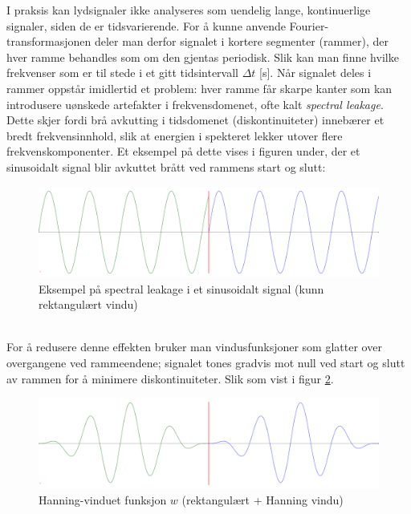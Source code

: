 \noindent
I praksis kan lydsignaler ikke analyseres som uendelig lange, kontinuerlige signaler, siden de er tidsvarierende. For å kunne anvende Fourier-transformasjonen deler man derfor signalet i kortere segmenter (rammer), der hver ramme behandles som om den gjentas periodisk. Slik kan man finne hvilke frekvenser som er til stede i et gitt tidsintervall $\Delta t$ [s].
Når signalet deles i rammer oppstår imidlertid et problem: hver ramme får skarpe kanter som kan introdusere uønskede artefakter i frekvensdomenet, ofte kalt \textit{spectral leakage}. Dette skjer fordi brå avkutting i tidsdomenet (diskontinuiteter) innebærer et bredt frekvensinnhold, slik at energien i spekteret lekker utover flere frekvenskomponenter. Et eksempel på dette vises i figuren under, der et sinusoidalt signal blir avkuttet brått ved rammens start og slutt:
\begin{figure}[h!]
    \centering
    \includegraphics[width=1\textwidth]{./Media/signal_uten_vindu_diskontoniuitete.png}
    \caption{Eksempel på spectral leakage i et sinusoidalt signal (kunn rektangulært vindu)}
    \label{fig:spectral_leakage}
\end{figure}\\
For å redusere denne effekten bruker man vindusfunksjoner som glatter over overgangene ved rammeendene; signalet tones gradvis mot null ved start og slutt av rammen for å minimere diskontinuiteter. Slik som vist i figur \ref{fig:window_func}.
\begin{figure}[h!]
    \centering
    \includegraphics[width=1\textwidth]{./Media/signal_med_vindu_ikke_diskontoniuitete.png}
    \caption{Hanning-vinduet funksjon $w$ (rektangulært + Hanning vindu)}
    \label{fig:window_func}
\end{figure}\\
